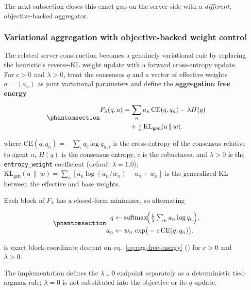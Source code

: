 \documentclass[
  english,
]{article}
\theoremstyle{plain}
\theoremstyle{definition}
\theoremstyle{remark}
\theoremstyle{definition}
\begin{document}
The next subsection closes this exact gap on the server side with a
\emph{different}, objective-backed aggregator.

\subsubsection{Variational aggregation with objective-backed weight
control}\label{sec:method-variational}

The related server construction becomes a genuinely variational rule by
replacing the heuristic's reverse-KL weight update with a forward
cross-entropy update. For \(c>0\) and \(\lambda>0\), treat the consensus
\(q\) and a vector of effective weights \(a = (a_n)\) as joint
variational parameters and define the \textbf{aggregation free energy}

\begin{equation}\protect\phantomsection\label{eq:agg-free-energy}{\begin{aligned}
F_\lambda(q, a)
&= \sum_n a_n\,\mathrm{CE}(q, q_n) - \lambda H(q)\\
&\quad + \tfrac{1}{c}\,\mathrm{KL_{gen}}(a \,\|\, w).
\end{aligned}}\end{equation}

where \(\mathrm{CE}(q, q_n) = -\sum_i q_i \log q_{n,i}\) is the
cross-entropy of the consensus relative to agent \(n\), \(H(q)\) is the
consensus entropy, \(c\) is the robustness, and \(\lambda>0\) is the
\texttt{entropy\_weight} coefficient (default \(\lambda=1.0\));
\(\mathrm{KL_{gen}}(a \,\|\, w) = \sum_n [a_n \log(a_n/w_n) - a_n + w_n]\)
is the generalized KL between the effective and base weights.

Each block of \(F_\lambda\) has a closed-form minimizer, so alternating

\begin{equation}\protect\phantomsection\label{eq:agg-updates}{\begin{aligned}
q
&\leftarrow \mathrm{softmax}\!\Big(
  \tfrac{1}{\lambda}\textstyle\sum_n a_n \log q_n\Big),\\
a_n
&\leftarrow w_n\,\exp\!\big(-c\,\mathrm{CE}(q, q_n)\big).
\end{aligned}}\end{equation}

is exact block-coordinate descent on eq.~\ref{eq:agg-free-energy}
() for \(c>0\) and \(\lambda>0\).

The implementation defines the \(\lambda\downarrow0\) endpoint
separately as a deterministic tied-argmax rule; \(\lambda=0\) is not
substituted into the objective or its \(q\)-update.
\end{document}
